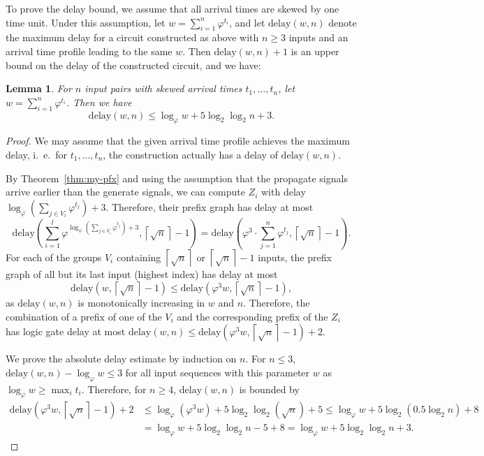 \documentclass[11pt,final,microtype]{scrartcl}
\theoremstyle{plain}
\newtheorem{lemma}[theorem]{Lemma}
\theoremstyle{definition}
\theoremstyle{remark}
\newcommand{\ceil}[1]{\left\lceil #1 \right\rceil}
\newcommand{\ld}{\log_{2}}
\newcommand{\loq}{\log_{\varphi}}
\newcommand{\delay}{\mathrm{delay}}
\begin{document}
To prove the delay bound, we assume that all arrival
times are skewed by one time unit. Under this assumption, let $w =
\sum_{i=1}^n \varphi^{t_i}$, and let $\delay(w, n)$ denote the maximum
delay for a circuit constructed as above with $n\geq 3$ inputs and an
arrival time profile leading to the same $w$. Then $\delay(w, n)+1$ is
an upper bound on the delay of the constructed circuit, and we have:

\begin{lemma} \label{lem:delay-bl-pfx} For $n$ input pairs with skewed arrival
  times $t_1, \dots, t_n$, let $w = \sum_{i=1}^n
  \varphi^{t_i}$. Then we have
  $$\delay(w, n) \leq \loq w + 5\ld\ld n + 3.$$
\end{lemma}
\begin{proof}
  We may assume that the given arrival time profile achieves the
  maximum delay, i.\ e.\ for $t_1, \dots, t_n$, the construction
  actually has a delay of $\delay(w, n)$.
 
  By Theorem~\ref{thm:my-pfx} and using the assumption that the
  propagate signals arrive earlier than the generate signals, we can
  compute $Z_i$ with delay $\loq \left(\sum_{j\in V_i}
    \varphi^{t_j}\right) + 3$. Therefore, their prefix graph has delay
  at most $$\delay\left(\sum_{i=1}^{l} \varphi^{\loq \left(\sum_{j\in
          V_i} \varphi^{t_j}\right) + 3}, \ceil{\sqrt{n}}-1\right)
  =\delay\left(\varphi^3 \cdot \sum_{j=1}^{n} \varphi^{t_j},
    \ceil{\sqrt{n}}-1\right).$$ For each of the groups $V_i$
  containing $\ceil{\sqrt{n}}$ or $\ceil{\sqrt{n}}-1$ inputs, the
  prefix graph of all but its last input (highest index) has delay at
  most $$\delay(w, \ceil{\sqrt{n}}-1) \leq \delay(\varphi^3 w,
  \ceil{\sqrt{n}} -1 ),$$ as $\delay(w,n)$ is monotonically increasing
  in $w$ and $n$. Therefore, the combination of a prefix of one of the
  $V_i$ and the corresponding prefix of the $Z_i$ has logic gate delay
  at most $\delay(w, n) \leq \delay\left(\varphi^3 w,
    \ceil{\sqrt{n}}-1\right)+2$. 

  We prove the absolute delay estimate by induction on $n$. For $n
  \leq 3$, $\delay(w, n) - \log_{\varphi} w \leq 3$ for all input
  sequences with this parameter $w$ as $\loq w\geq \max_i
  t_i$. Therefore, for $n \geq 4$, $\delay(w,n)$ is bounded by
  \begin{align*}
    \delay(\varphi^3w, \ceil{\sqrt{n}}-1) + 2
    &\leq \loq (\varphi^3 w) + 5\ld \ld(\sqrt{n}) + 5
    \leq \loq w + 5 \ld(0.5 \ld n) + 8 \\
    &= \loq w + 5\ld\ld n - 5 + 8 
    = \loq w + 5\ld\ld n + 3.
\end{align*}
\end{proof}
\end{document}
